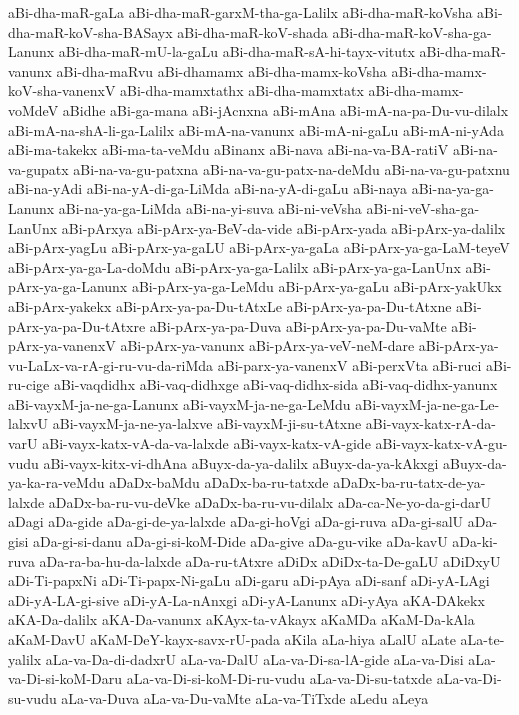 {aBi-dha-maR-gaLa
aBi-dha-maR-garxM-tha-ga-Lalilx
aBi-dha-maR-koVsha
aBi-dha-maR-koV-sha-BASayx
aBi-dha-maR-koV-shada
aBi-dha-maR-koV-sha-ga-Lanunx
aBi-dha-maR-mU-la-gaLu
aBi-dha-maR-sA-hi-tayx-vitutx
aBi-dha-maR-vanunx
aBi-dha-maRvu
aBi-dhamamx
aBi-dha-mamx-koVsha
aBi-dha-mamx-koV-sha-vanenxV
aBi-dha-mamxtathx
aBi-dha-mamxtatx
aBi-dha-mamx-voMdeV
aBidhe
aBi-ga-mana
aBi-jAcnxna
aBi-mAna
aBi-mA-na-pa-Du-vu-dilalx
aBi-mA-na-shA-li-ga-Lalilx
aBi-mA-na-vanunx
aBi-mA-ni-gaLu
aBi-mA-ni-yAda
aBi-ma-takekx
aBi-ma-ta-veMdu
aBinanx
aBi-nava
aBi-na-va-BA-ratiV
aBi-na-va-gupatx
aBi-na-va-gu-patxna
aBi-na-va-gu-patx-na-deMdu
aBi-na-va-gu-patxnu
aBi-na-yAdi
aBi-na-yA-di-ga-LiMda
aBi-na-yA-di-gaLu
aBi-naya
aBi-na-ya-ga-Lanunx
aBi-na-ya-ga-LiMda
aBi-na-yi-suva
aBi-ni-veVsha
aBi-ni-veV-sha-ga-LanUnx
aBi-pArxya
aBi-pArx-ya-BeV-da-vide
aBi-pArx-yada
aBi-pArx-ya-dalilx
aBi-pArx-yagLu
aBi-pArx-ya-gaLU
aBi-pArx-ya-gaLa
aBi-pArx-ya-ga-LaM-teyeV
aBi-pArx-ya-ga-La-doMdu
aBi-pArx-ya-ga-Lalilx
aBi-pArx-ya-ga-LanUnx
aBi-pArx-ya-ga-Lanunx
aBi-pArx-ya-ga-LeMdu
aBi-pArx-ya-gaLu
aBi-pArx-yakUkx
aBi-pArx-yakekx
aBi-pArx-ya-pa-Du-tAtxLe
aBi-pArx-ya-pa-Du-tAtxne
aBi-pArx-ya-pa-Du-tAtxre
aBi-pArx-ya-pa-Duva
aBi-pArx-ya-pa-Du-vaMte
aBi-pArx-ya-vanenxV
aBi-pArx-ya-vanunx
aBi-pArx-ya-veV-neM-dare
aBi-pArx-ya-vu-LaLx-va-rA-gi-ru-vu-da-riMda
aBi-parx-ya-vanenxV
aBi-perxVta
aBi-ruci
aBi-ru-cige
aBi-vaqdidhx
aBi-vaq-didhxge
aBi-vaq-didhx-sida
aBi-vaq-didhx-yanunx
aBi-vayxM-ja-ne-ga-Lanunx
aBi-vayxM-ja-ne-ga-LeMdu
aBi-vayxM-ja-ne-ga-Le-lalxvU
aBi-vayxM-ja-ne-ya-lalxve
aBi-vayxM-ji-su-tAtxne
aBi-vayx-katx-rA-da-varU
aBi-vayx-katx-vA-da-va-lalxde
aBi-vayx-katx-vA-gide
aBi-vayx-katx-vA-gu-vudu
aBi-vayx-kitx-vi-dhAna
aBuyx-da-ya-dalilx
aBuyx-da-ya-kAkxgi
aBuyx-da-ya-ka-ra-veMdu
aDaDx-baMdu
aDaDx-ba-ru-tatxde
aDaDx-ba-ru-tatx-de-ya-lalxde
aDaDx-ba-ru-vu-deVke
aDaDx-ba-ru-vu-dilalx
aDa-ca-Ne-yo-da-gi-darU
aDagi
aDa-gide
aDa-gi-de-ya-lalxde
aDa-gi-hoVgi
aDa-gi-ruva
aDa-gi-salU
aDa-gisi
aDa-gi-si-danu
aDa-gi-si-koM-Dide
aDa-give
aDa-gu-vike
aDa-kavU
aDa-ki-ruva
aDa-ra-ba-hu-da-lalxde
aDa-ru-tAtxre
aDiDx
aDiDx-ta-De-gaLU
aDiDxyU
aDi-Ti-papxNi
aDi-Ti-papx-Ni-gaLu
aDi-garu
aDi-pAya
aDi-sanf
aDi-yA-LAgi
aDi-yA-LA-gi-sive
aDi-yA-La-nAnxgi
aDi-yA-Lanunx
aDi-yAya
aKA-DAkekx
aKA-Da-dalilx
aKA-Da-vanunx
aKAyx-ta-vAkayx
aKaMDa
aKaM-Da-kAla
aKaM-DavU
aKaM-DeY-kayx-savx-rU-pada
aKila
aLa-hiya
aLalU
aLate
aLa-te-yalilx
aLa-va-Da-di-dadxrU
aLa-va-DalU
aLa-va-Di-sa-lA-gide
aLa-va-Disi
aLa-va-Di-si-koM-Daru
aLa-va-Di-si-koM-Di-ru-vudu
aLa-va-Di-su-tatxde
aLa-va-Di-su-vudu
aLa-va-Duva
aLa-va-Du-vaMte
aLa-va-TiTxde
aLedu
aLeya
}
